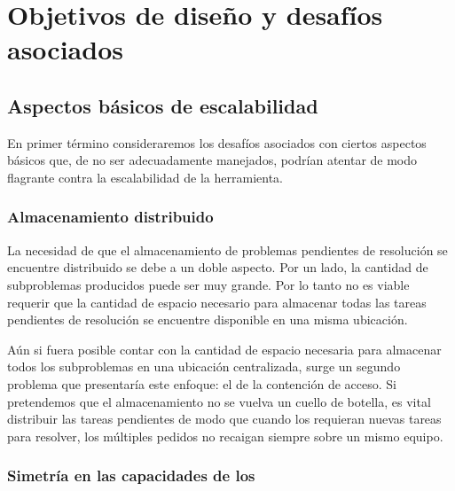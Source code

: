 

\section{Objetivos de diseño y desafíos asociados}

\subsection{Aspectos básicos de escalabilidad}

En primer término consideraremos los desafíos asociados con ciertos aspectos
básicos que, de no ser adecuadamente manejados, podrían atentar de modo flagrante
contra la escalabilidad de la herramienta.

\subsubsection{Almacenamiento distribuido}

La necesidad de que el almacenamiento de problemas pendientes de resolución se
encuentre distribuido se debe a un doble aspecto. Por un lado, la cantidad de
subproblemas producidos puede ser muy grande. Por lo tanto no es viable
requerir que la cantidad de espacio necesario para almacenar todas las tareas
pendientes de resolución se encuentre disponible en una misma ubicación.

Aún si fuera posible contar con la cantidad de espacio necesaria para almacenar
todos los subproblemas en una ubicación centralizada, surge un segundo problema
que presentaría este enfoque: el de la contención de acceso. Si
pretendemos que el almacenamiento no se vuelva un cuello de botella, es vital
distribuir las tareas pendientes de modo que cuando los \ws requieran nuevas
tareas para resolver, los múltiples pedidos no recaigan siempre sobre un mismo equipo.


\subsubsection{Simetría en las capacidades de los \ws}

